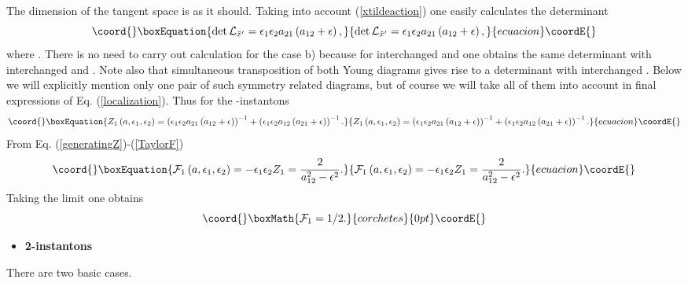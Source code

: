 \documentclass[a4paper,12pt]{article}
\begin{document}
The dimension of the tangent space is \coordHE{} as it should. Taking into account (\ref{xtildeaction}) one
easily calculates the determinant
\begin{equation}\coord{}\boxEquation{
\det {\cal L}_{{\tilde x}'}=\epsilon_1 \epsilon_2 a_{21}
\left(a_{12}+\epsilon \right),
}{
\det {\cal L}_{{\tilde x}'}=\epsilon_1 \epsilon_2 a_{21}
\left(a_{12}+\epsilon \right),
}{ecuacion}\coordE{}\end{equation}
where \coordHE{}. There is no need to carry out calculation for the case b)
because for interchanged \coordHE{} and \coordHE{} one obtains the same
determinant with interchanged \coordHE{} and \coordHE{}. Note also that
simultaneous transposition of both Young diagrams gives rise to a
determinant with interchanged \coordHE{}. Below we will explicitly mention only one pair of
such symmetry related diagrams, but of course we will take all of
them into account in final expressions of \coordHE{} Eq.
(\ref{localization}). Thus for the \coordHE{}-instantons
\begin{equation}\coord{}\boxEquation{
Z_1\left(a, \epsilon_1, \epsilon_2 \right)=\left(\epsilon_1 \epsilon_2 a_{21} \left(a_{12}+\epsilon
\right)\right)^{-1}+\left(\epsilon_1 \epsilon_2 a_{12} \left(a_{21}+\epsilon \right)\right)^{-1}.
}{
Z_1\left(a, \epsilon_1, \epsilon_2 \right)=\left(\epsilon_1 \epsilon_2 a_{21} \left(a_{12}+\epsilon
\right)\right)^{-1}+\left(\epsilon_1 \epsilon_2 a_{12} \left(a_{21}+\epsilon \right)\right)^{-1}.
}{ecuacion}\coordE{}\end{equation}
From Eq. (\ref{generatingZ})-(\ref{TaylorF})
\begin{equation}\coord{}\boxEquation{
{\cal F}_1\left(a, \epsilon_1, \epsilon_2 \right)=-\epsilon_1
\epsilon_2 Z_1 =\frac{2}{a_{12}^2-\epsilon^2}.
}{
{\cal F}_1\left(a, \epsilon_1, \epsilon_2 \right)=-\epsilon_1
\epsilon_2 Z_1 =\frac{2}{a_{12}^2-\epsilon^2}.
}{ecuacion}\coordE{}\end{equation}
Taking the limit \coordHE{} one obtains
\[\coord{}\boxMath{
{\cal F}_1=1/2.
}{corchetes}{0pt}\coordE{}\]
\begin{itemize}
\item {\bf 2-instantons} \end{itemize} There are two basic cases.
\end{document}
